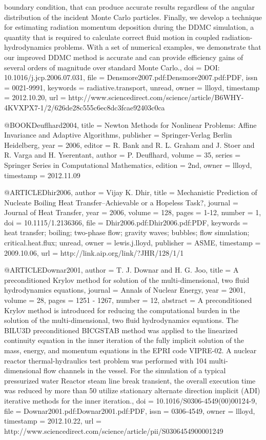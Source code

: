 {{{	boundary condition, that can produce accurate results regardless
	of the angular distribution of the incident Monte Carlo particles.
	Finally, we develop a technique for estimating radiation momentum
	deposition during the DDMC simulation, a quantity that is required
	to calculate correct fluid motion in coupled radiation-hydrodynamics
	problems. With a set of numerical examples, we demonstrate that our
	improved DDMC method is accurate and can provide efficiency gains
	of several orders of magnitude over standard Monte Carlo.},
  doi = {DOI: 10.1016/j.jcp.2006.07.031},
  file = {Densmore2007.pdf:Densmore2007.pdf:PDF},
  issn = {0021-9991},
  keywords = {radiative.transport, unread},
  owner = {llloyd},
  timestamp = {2012.10.20},
  url = {http://www.sciencedirect.com/science/article/B6WHY-4KVXPX7-1/2/626de28c555c6ec8dc3fcae92403c0ca}
}

@BOOK{Deuflhard2004,
  title = {Newton Methods for Nonlinear Problems: Affine Invariance and Adaptive
	Algorithms},
  publisher = {Springer-Verlag Berlin Heidelberg},
  year = {2006},
  editor = {R. Bank and R. L. Graham and J. Stoer and R. Varga and H. Yserentant},
  author = {P. Deuflhard},
  volume = {35},
  series = {Springer Series in Computational Mathematics},
  edition = {2nd},
  owner = {llloyd},
  timestamp = {2012.11.09}
}

@ARTICLE{Dhir2006,
  author = {Vijay K. Dhir},
  title = {Mechanistic Prediction of Nucleate Boiling Heat Transfer--Achievable
	or a Hopeless Task?},
  journal = {Journal of Heat Transfer},
  year = {2006},
  volume = {128},
  pages = {1-12},
  number = {1},
  doi = {10.1115/1.2136366},
  file = {Dhir2006.pdf:Dhir2006.pdf:PDF},
  keywords = {heat transfer; boiling; two-phase flow; gravity waves; bubbles; flow
	simulation; critical.heat.flux; unread},
  owner = {lewis.j.lloyd},
  publisher = {ASME},
  timestamp = {2009.10.06},
  url = {http://link.aip.org/link/?JHR/128/1/1}
}

@ARTICLE{Downar2001,
  author = {T. J. Downar and H. G. Joo},
  title = {A preconditioned Krylov method for solution of the multi-dimensional,
	two fluid hydrodynamics equations},
  journal = {Annals of Nuclear Energy},
  year = {2001},
  volume = {28},
  pages = {1251 - 1267},
  number = {12},
  abstract = {A preconditioned Krylov method is introduced for reducing the computational
	burden in the solution of the multi-dimensional, two fluid hydrodynamics
	equations. The BILU3D preconditioned BICGSTAB method was applied
	to the linearized continuity equation in the inner iteration of the
	fully implicit solution of the mass, energy, and momentum equations
	in the EPRI code VIPRE-02. A nuclear reactor thermal-hydraulics test
	problem was performed with 104 multi-dimensional flow channels in
	the vessel. For the simulation of a typical pressurized water Reactor
	steam line break transient, the overall execution time was reduced
	by more than 50%
	utilize stationary alternate direction implicit (ADI) iterative methods
	for the inner iteration.},
  doi = {10.1016/S0306-4549(00)00124-9},
  file = {Downar2001.pdf:Downar2001.pdf:PDF},
  issn = {0306-4549},
  owner = {llloyd},
  timestamp = {2012.10.22},
  url = {http://www.sciencedirect.com/science/article/pii/S0306454900001249}
}

}
